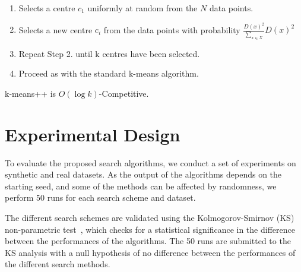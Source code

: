 \documentclass{elsarticle}
\begin{document}
\begin{enumerate}
    \item Selects a centre $c_1$ uniformly at random from the $N$ data points.
    \item Selects a new centre $c_i$ from the data points with probability $\frac{D(x)^2}{\sum_{x\in X}}D(x)^2$
    \item Repeat Step 2. until k centres have been selected.
    \item Proceed as with the standard k-means algorithm.
\end{enumerate}

k-means++ is $O(\log k)$-Competitive.

\section{Experimental Design}

To evaluate the proposed search algorithms, we conduct a set of experiments on synthetic and real datasets. As the output of the algorithms depends on the starting seed, and some of the methods can be affected by randomness, we perform 50 runs for each search scheme and dataset. 

The different search schemes are validated using the Kolmogorov-Smirnov (KS) non-parametric test~\citep{Pettitt77S}, which checks for a statistical significance in the difference between the performances of the algorithms. The 50 runs are submitted to the KS analysis with a null hypothesis of no difference between the performances of the different search methods.  
\end{document}
